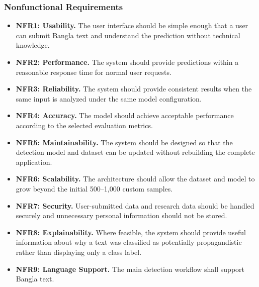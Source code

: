 \documentclass[12pt,a4paper]{report}
\begin{document}
\subsubsection*{Nonfunctional Requirements}
\begin{itemize}
  \item \textbf{NFR1: Usability.} The user interface should be simple enough that a
        user can submit Bangla text and understand the prediction without
        technical knowledge.
  \item \textbf{NFR2: Performance.} The system should provide predictions within a
        reasonable response time for normal user requests.
  \item \textbf{NFR3: Reliability.} The system should provide consistent results
        when the same input is analyzed under the same model configuration.
  \item \textbf{NFR4: Accuracy.} The model should achieve acceptable performance
        according to the selected evaluation metrics.
  \item \textbf{NFR5: Maintainability.} The system should be designed so that the
        detection model and dataset can be updated without rebuilding the complete
        application.
  \item \textbf{NFR6: Scalability.} The architecture should allow the dataset and
        model to grow beyond the initial 500--1,000 custom samples.
  \item \textbf{NFR7: Security.} User-submitted data and research data should be
        handled securely and unnecessary personal information should not be stored.
  \item \textbf{NFR8: Explainability.} Where feasible, the system should provide
        useful information about why a text was classified as potentially
        propagandistic rather than displaying only a class label.
  \item \textbf{NFR9: Language Support.} The main detection workflow shall support
        Bangla text.
\end{itemize}

\end{document}
